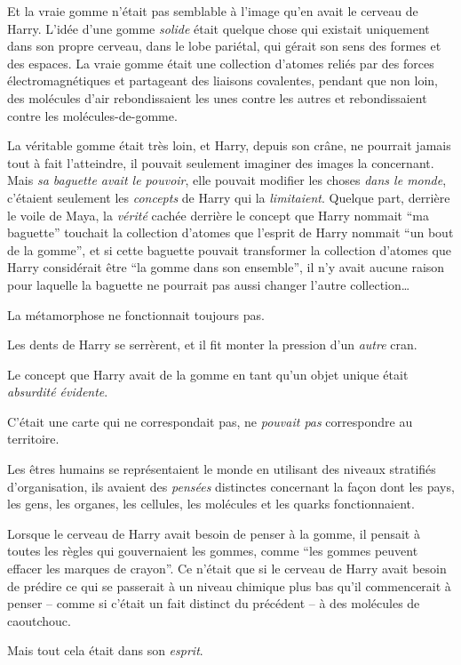 Et la vraie gomme n'était pas semblable à l'image qu'en avait le cerveau de Harry.
L'idée d'une gomme \emph{solide} était quelque chose qui existait uniquement dans son propre cerveau, dans le lobe pariétal, qui gérait son sens des formes et des espaces.
La vraie gomme était une collection d'atomes reliés par des forces électromagnétiques et partageant des liaisons covalentes, pendant que non loin, des molécules d'air rebondissaient les unes contre les autres et rebondissaient contre les molécules-de-gomme.

La véritable gomme était très loin, et Harry, depuis son crâne, ne pourrait jamais tout à fait l'atteindre, il pouvait seulement imaginer des images la concernant.
Mais \emph{sa baguette avait le pouvoir}, elle pouvait modifier les choses \emph{dans le monde}, c'étaient seulement les \emph{concepts} de Harry qui la \emph{limitaient}.
Quelque part, derrière le voile de Maya, la \emph{vérité} cachée derrière le concept que Harry nommait “ma baguette” touchait la collection d'atomes que l'esprit de Harry nommait “un bout de la gomme”, et si cette baguette pouvait transformer la collection d'atomes que Harry considérait être “la gomme dans son ensemble”, il n'y avait aucune raison pour laquelle la baguette ne pourrait pas aussi changer l'autre collection…

La métamorphose ne fonctionnait toujours pas.

Les dents de Harry se serrèrent, et il fit monter la pression d'un \emph{autre} cran.

Le concept que Harry avait de la gomme en tant qu'un objet unique était \emph{absurdité évidente}.

C'était une carte qui ne correspondait pas, ne \emph{pouvait pas} correspondre au territoire.

Les êtres humains se représentaient le monde en utilisant des niveaux stratifiés d'organisation, ils avaient des \emph{pensées} distinctes concernant la façon dont les pays, les gens, les organes, les cellules, les molécules et les quarks fonctionnaient.

Lorsque le cerveau de Harry avait besoin de penser à la gomme, il pensait à toutes les règles qui gouvernaient les gommes, comme “les gommes peuvent effacer les marques de crayon”.
Ce n'était que si le cerveau de Harry avait besoin de prédire ce qui se passerait à un niveau chimique plus bas qu'il commencerait à penser -- comme si c'était un fait distinct du précédent -- à des molécules de caoutchouc.

Mais tout cela était dans son \emph{esprit}.

